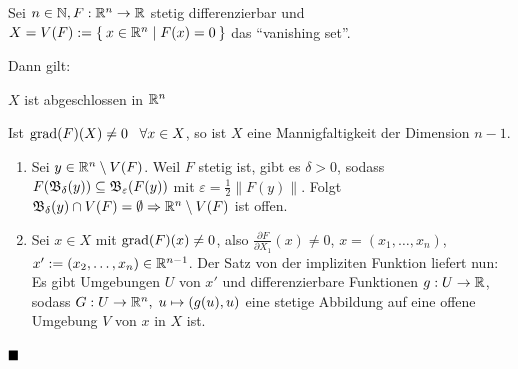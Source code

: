\begin{bemerkung}
    Sei $n \in \mathbb{N}, F:\mathbb{R}^n \rightarrow \mathbb{R}$ stetig differenzierbar
    und $X = V(F) := \Set{x \in \ensuremath{\mathbb{R}}^n | F(x) = 0}$ das \enquote{vanishing set}.

    Dann gilt:
    \begin{bemenum}
        \item $X$ ist abgeschlossen in $\mathbb{R}^n$
        \item Ist $\operatorname{grad}(F)(X) \neq 0 \;\;\;\forall{x \in X}$, so ist
              $X$ eine Mannigfaltigkeit der Dimension $n-1$.  \label{bem:Mannigfaltigkeitskriterium}
    \end{bemenum}
\end{bemerkung}

\begin{beweis}\leavevmode
    \begin{enumerate}[label=\alph*),ref=\thedefinition.\alph*]
        \item Sei $y \in \mathbb{R}^n \setminus V(F)$. Weil $F$ stetig ist,
              gibt es $\delta > 0$, sodass $F(\mathfrak{B}_\delta(y)) \subseteq \mathfrak{B}_\varepsilon(F(y))$
              mit $\varepsilon = \frac{1}{2} \|F(y)\|$. Folgt
              $\mathfrak{B}_\delta(y) \cap V(F) = \emptyset \Rightarrow \mathbb{R}^n \setminus V(F)$
              ist offen.
        \item Sei $x \in X$ mit $\operatorname{grad}(F)(x) \neq 0$, also
              \obda $\frac{\partial F}{\partial X_1} (x) \neq 0$,
              $x = (x_1, \dots, x_n)$, $x' := (x_2, \dots, x_n) \in \mathbb{R}^{n-1}$.
              Der Satz von der impliziten Funktion liefert nun:
              Es gibt Umgebungen $U$ von $x'$ und differenzierbare
              Funktionen $g: U \rightarrow \mathbb{R}$, sodass
              $G: U \rightarrow \mathbb{R}^n, \; u \mapsto (g(u), u)$
              eine stetige Abbildung auf eine offene Umgebung $V$ von
              $x$ in $X$ ist.
    \end{enumerate}  
    $\qed$
\end{beweis}

